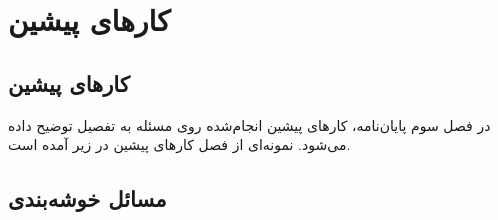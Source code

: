 \chapter{کارهای پیشین}
\label{chapter:literature}
\section{کارهای پیشین}

در فصل سوم پایان‌نامه، کارهای پیشین انجام‌شده روی مسئله به تفصیل توضیح داده می‌شود.
نمونه‌ای از فصل کارهای پیشین در زیر آمده است.

\section{مسائل خوشه‌بندی}
